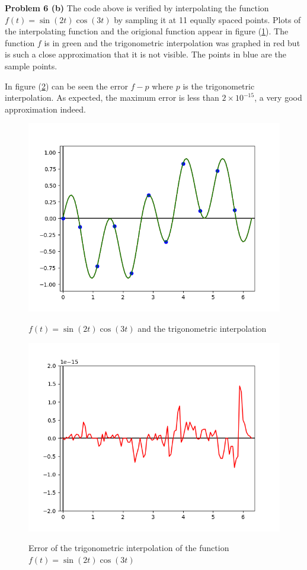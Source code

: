 \documentclass[12pt]{article}
\newcommand{\problem}[1]{\hspace{-4 ex} \large \textbf{Problem #1} }
\begin{document}
\problem{6 (b)} The code above is verified by interpolating the function $f(t)=\sin(2t)\cos(3t)$ by sampling it at 11 equally spaced points. Plots of the interpolating function and the origional function appear in figure (\ref{hw5_p6_fig1}). The function $f$ is in green and the trigonometric interpolation was graphed in red but is such a close approximation that it is not visible. The points in blue are the sample points. \bigbreak

In figure (\ref{hw5_p6_fig2}) can be seen the error $f-p$ where $p$ is the trigonometric interpolation. As expected, the maximum error is less than $2 \times 10^{-15}$, a very good approximation indeed.

\begin{figure}[h]
	\caption{$f(t)=\sin(2t)\cos(3t)$ and the trigonometric interpolation}
	\includegraphics[width=.8\textwidth]{hw5_p6_fig1}
	\label{hw5_p6_fig1}
	\centering
\end{figure}

\begin{figure}[h]
	\caption{Error of the trigonometric interpolation of the function $f(t)=\sin(2t)\cos(3t)$}
	\includegraphics[width=.8\textwidth]{hw5_p6_fig2}
	\label{hw5_p6_fig2}
	\centering
\end{figure}
\end{document}

